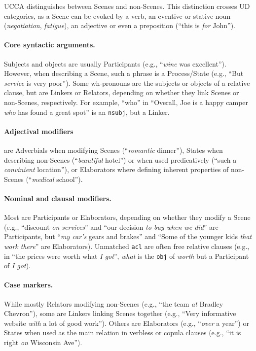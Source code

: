 \documentclass[11pt,a4paper]{article}
\begin{document}
UCCA distinguishes between Scenes and non-Scenes.
This distinction crosses UD categories,
as a Scene can be evoked by a verb, an eventive or stative
noun (\textit{negotiation}, \textit{fatigue}),
an adjective or even a preposition (``this is \textit{for} John'').

\paragraph{Core syntactic arguments.}
      Subjects and objects are usually Participants (e.g., ``\textit{wine} was excellent'').
      However, when describing a Scene, such a phrase is a Process/State
      (e.g., ``But \textit{service} is very poor'').
      Some wh-pronouns are the subjects or objects of a relative clause, but
      are Linkers or Relators,
      depending on whether they link Scenes or non-Scenes, respectively.
      For example, ``who'' in ``Overall, Joe is a happy camper \textit{who} has found a great spot'' is an \texttt{nsubj}, but a Linker.

\paragraph{Adjectival modifiers} are Adverbials when modifying Scenes
    (``\textit{romantic} dinner''), States when describing non-Scenes (``\textit{beautiful} hotel'') 
    or when used predicatively (``such a \textit{convinient} location''), or
    Elaborators where defining inherent properties of non-Scenes (``\textit{medical} school'').

\paragraph{Nominal and clausal modifiers.}
    Most are Participants or Elaborators,
    depending on whether they modify a Scene (e.g.,
    ``discount \textit{on services}'' and
    ``our decision \textit{to buy when we did}'' are Participants,
    but ``\textit{my car's} gears and brakes'' and ``Some of the younger kids \textit{that work there}'' are Elaborators).
    Unmatched \texttt{acl} are often
    free relative clauses (e.g., in ``the prices were worth what \textit{I got}'',
    \textit{what} is the \texttt{obj} of \textit{worth} but
    a Participant of \textit{I got}).

\paragraph{Case markers.}
      While mostly Relators
      modifying non-Scenes (e.g., ``the team \textit{at} Bradley Chevron''),
      some are Linkers linking Scenes together 
      (e.g., ``Very informative website \textit{with} a lot of good work'').
      Others are Elaborators (e.g., ``\textit{over} a year'') or States
      when used as the main relation in verbless or copula clauses
      (e.g., ``it is right \textit{on} Wisconsin Ave'').
    
\end{document}
